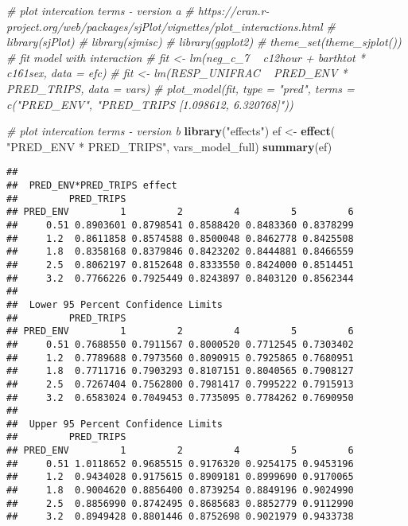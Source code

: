 \documentclass[]{article}
\newenvironment{Shaded}{\begin{snugshade}}{\end{snugshade}}
\newcommand{\KeywordTok}[1]{\textcolor[rgb]{0.13,0.29,0.53}{\textbf{#1}}}
\newcommand{\StringTok}[1]{\textcolor[rgb]{0.31,0.60,0.02}{#1}}
\newcommand{\CommentTok}[1]{\textcolor[rgb]{0.56,0.35,0.01}{\textit{#1}}}
\newcommand{\NormalTok}[1]{#1}
\begin{document}
\begin{Shaded}
\begin{Highlighting}[]
\CommentTok{# plot intercation terms - version a}
\CommentTok{# https://cran.r-project.org/web/packages/sjPlot/vignettes/plot_interactions.html}
\CommentTok{# library(sjPlot)}
\CommentTok{# library(sjmisc)}
\CommentTok{# library(ggplot2)}
\CommentTok{# theme_set(theme_sjplot())}
\CommentTok{# fit model with interaction}
\CommentTok{# fit <- lm(neg_c_7 ~ c12hour + barthtot * c161sex, data = efc)}
\CommentTok{# fit <- lm(RESP_UNIFRAC ~ PRED_ENV * PRED_TRIPS, data = vars)}
\CommentTok{# plot_model(fit, type = "pred", terms = c("PRED_ENV", "PRED_TRIPS [1.098612, 6.320768]"))}

\CommentTok{# plot intercation terms - version b}
\KeywordTok{library}\NormalTok{(}\StringTok{"effects"}\NormalTok{)}
\NormalTok{ef <-}\StringTok{ }\KeywordTok{effect}\NormalTok{( }\StringTok{"PRED_ENV * PRED_TRIPS"}\NormalTok{, vars_model_full)}
\KeywordTok{summary}\NormalTok{(ef)}
\end{Highlighting}
\end{Shaded}

\begin{verbatim}
## 
##  PRED_ENV*PRED_TRIPS effect
##         PRED_TRIPS
## PRED_ENV         1         2         4         5         6
##     0.51 0.8903601 0.8798541 0.8588420 0.8483360 0.8378299
##     1.2  0.8611858 0.8574588 0.8500048 0.8462778 0.8425508
##     1.8  0.8358168 0.8379846 0.8423202 0.8444881 0.8466559
##     2.5  0.8062197 0.8152648 0.8333550 0.8424000 0.8514451
##     3.2  0.7766226 0.7925449 0.8243897 0.8403120 0.8562344
## 
##  Lower 95 Percent Confidence Limits
##         PRED_TRIPS
## PRED_ENV         1         2         4         5         6
##     0.51 0.7688550 0.7911567 0.8000520 0.7712545 0.7303402
##     1.2  0.7789688 0.7973560 0.8090915 0.7925865 0.7680951
##     1.8  0.7711716 0.7903293 0.8107151 0.8040565 0.7908127
##     2.5  0.7267404 0.7562800 0.7981417 0.7995222 0.7915913
##     3.2  0.6583024 0.7049453 0.7735095 0.7784262 0.7690950
## 
##  Upper 95 Percent Confidence Limits
##         PRED_TRIPS
## PRED_ENV         1         2         4         5         6
##     0.51 1.0118652 0.9685515 0.9176320 0.9254175 0.9453196
##     1.2  0.9434028 0.9175615 0.8909181 0.8999690 0.9170065
##     1.8  0.9004620 0.8856400 0.8739254 0.8849196 0.9024990
##     2.5  0.8856990 0.8742495 0.8685683 0.8852779 0.9112990
##     3.2  0.8949428 0.8801446 0.8752698 0.9021979 0.9433738
\end{verbatim}
\end{document}
